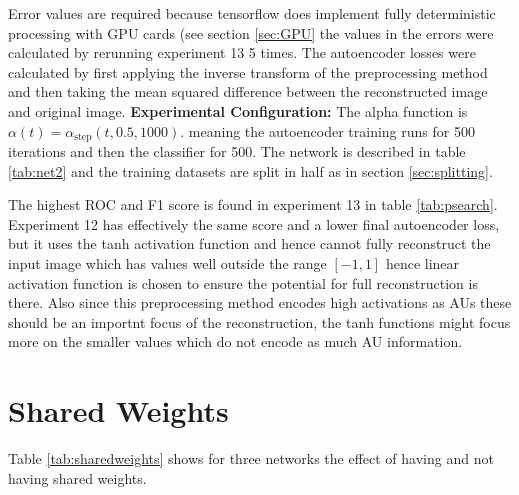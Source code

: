 \begin{table}[!h]
{{              Error values are required because tensorflow does implement fully deterministic
              processing with GPU cards (see section \ref{sec:GPU} the values in the errors were
              calculated by rerunning experiment 13 5 times. The autoencoder losses were calculated
              by first applying the inverse transform of the preprocessing method and then taking the mean squared
              difference between the reconstructed image and original image. {\bf Experimental Configuration:}
              The alpha function is $\alpha(t)=\alpha_{\text{step}}(t,0.5,1000)$.
              meaning the autoencoder training runs for 500 iterations and then the classifier for 500.
              The network is described in table \ref{tab:net2} and the training datasets are split in half as in section
              \ref{sec:splitting}.}
          \label{tab:psearch} }
          \end{table}

          The highest ROC and F1 score is found in experiment 13 in table \ref{tab:psearch}. Experiment 12
          has effectively the same score and a lower final autoencoder loss, but it uses the tanh activation
          function and hence cannot fully reconstruct the input image which has values well outside the
          range $[-1,1]$ hence linear activation function is chosen to ensure the potential for full reconstruction is there.
          Also since this preprocessing method encodes high activations as AUs these should be
          an importnt focus of the reconstruction, the tanh functions might focus more on the smaller values which
          do not encode as much AU information.

        \newpage
        \section{Shared Weights}
        
          Table \ref{tab:sharedweights} shows
          for three networks the effect of having and not having shared weights.

